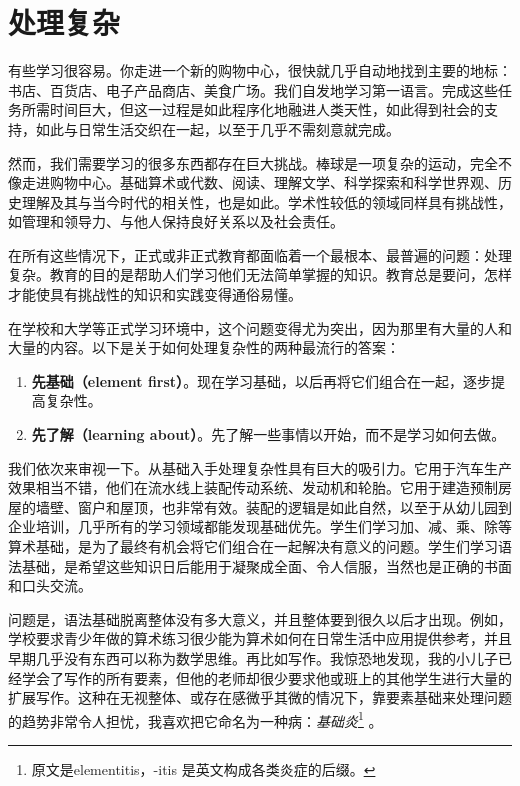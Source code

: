 \section*{处理复杂}

有些学习很容易。你走进一个新的购物中心，很快就几乎自动地找到主要的地标：书店、百货店、电子产品商店、美食广场。我们自发地学习第一语言。完成这些任务所需时间巨大，但这一过程是如此程序化地融进人类天性，如此得到社会的支持，如此与日常生活交织在一起，以至于几乎不需刻意就完成。

然而，我们需要学习的很多东西都存在巨大挑战。棒球是一项复杂的运动，完全不像走进购物中心。基础算术或代数、阅读、理解文学、科学探索和科学世界观、历史理解及其与当今时代的相关性，也是如此。学术性较低的领域同样具有挑战性，如管理和领导力、与他人保持良好关系以及社会责任。

在所有这些情况下，正式或非正式教育都面临着一个最根本、最普遍的问题：处理复杂。教育的目的是帮助人们学习他们无法简单掌握的知识。教育总是要问，怎样才能使具有挑战性的知识和实践变得通俗易懂。

在学校和大学等正式学习环境中，这个问题变得尤为突出，因为那里有大量的人和大量的内容。以下是关于如何处理复杂性的两种最流行的答案：

\begin{enumerate}
\item \textbf{先基础（element first）}。现在学习基础，以后再将它们组合在一起，逐步提高复杂性。
\item \textbf{先了解（learning about）}。先了解一些事情以开始，而不是学习如何去做。
\end{enumerate}

我们依次来审视一下。从基础入手处理复杂性具有巨大的吸引力。它用于汽车生产效果相当不错，他们在流水线上装配传动系统、发动机和轮胎。它用于建造预制房屋的墙壁、窗户和屋顶，也非常有效。装配的逻辑是如此自然，以至于从幼儿园到企业培训，几乎所有的学习领域都能发现基础优先。学生们学习加、减、乘、除等算术基础，是为了最终有机会将它们组合在一起解决有意义的问题。学生们学习语法基础，是希望这些知识日后能用于凝聚成全面、令人信服，当然也是正确的书面和口头交流。

问题是，语法基础脱离整体没有多大意义，并且整体要到很久以后才出现。例如，学校要求青少年做的算术练习很少能为算术如何在日常生活中应用提供参考，并且早期几乎没有东西可以称为数学思维。再比如写作。我惊恐地发现，我的小儿子已经学会了写作的所有要素，但他的老师却很少要求他或班上的其他学生进行大量的扩展写作。这种在无视整体、或存在感微乎其微的情况下，靠要素基础来处理问题的趋势非常令人担忧，我喜欢把它命名为一种病：\textit{基础炎}\footnote{原文是elementitis，-itis 是英文构成各类炎症的后缀。} 。

